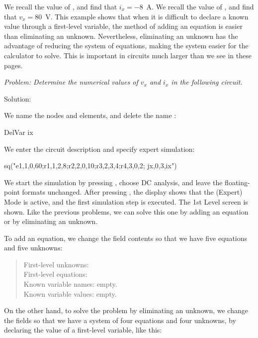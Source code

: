 We recall the value of , and find that $i_x = -8$~A. We
recall the value of , and find that $v_x = 80$~V. This
example shows that when it is difficult to declare a known value
through a first-level variable, the method of adding an equation is
easier than eliminating an unknown. Nevertheless, eliminating an
unknown has the advantage of reducing the system of equations,
making the system easier for the calculator to solve. This is
important in circuits much larger than we see in these pages.


\emph{Problem: Determine the numerical values of $v_x$ and $i_x$ in
the following circuit.}

Solution:

We name the nodes and elements, and delete the name :

\begin{entry}
DelVar ix
\end{entry}

We enter the circuit description and specify expert simulation:

\begin{entry}
sq\expert("e1,1,0,60;r1,1,2,8;r2,2,0,10;r3,2,3,4;r4,3,0,2;
          jx,0,3,ix")
\end{entry}

We start the simulation by pressing , choose DC analysis,
and leave the floating-point formats unchanged. After pressing
, the display shows that the (Expert) Mode is active, and
the first simulation step is executed. The 1st Level screen is
shown. Like the previous problems, we can solve this one by adding
an equation or by eliminating an unknown.

To add an equation, we change the field contents so that we have
five equations and five unknowns:

\begin{quote}
First-level unknowns: \\
First-level equations: \\
Known variable names: empty.\\
Known variable values: empty.
\end{quote}

On the other hand, to solve the problem by eliminating an unknown,
we change the fields so that we have a system of four equations and
four unknowns, by declaring the value of a first-level variable,
like this:

